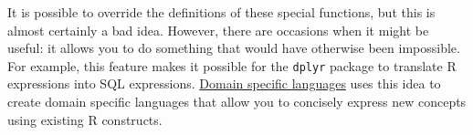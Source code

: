 \begin{Shaded}
\begin{Highlighting}[]
\StringTok{ }\StringTok{ }
\StringTok{ }
\DataTypeTok{+}

\NormalTok{:}\NormalTok{) }
\NormalTok{:}\NormalTok{, }

\StringTok{ }\NormalTok{) }\NormalTok{(}\NormalTok{(}\NormalTok{)}
\StringTok{ }\NormalTok{, }\NormalTok{(}\NormalTok{), }\NormalTok{(}\NormalTok{))}

\NormalTok{x[}\NormalTok{]}
\DataTypeTok{[}\NormalTok{)}

\NormalTok{\{ }\NormalTok{(}\NormalTok{); }\NormalTok{(}\NormalTok{); }\NormalTok{(}\NormalTok{) \}}
\DataTypeTok{\{}\NormalTok{(}\NormalTok{(}\NormalTok{), }\NormalTok{(}\NormalTok{), }\NormalTok{(}\NormalTok{))}
\end{Highlighting}
\end{Shaded}

It is possible to override the definitions of these special functions,
but this is almost certainly a bad idea. However, there are occasions
when it might be useful: it allows you to do something that would have
otherwise been impossible. For example, this feature makes it possible
for the \texttt{dplyr} package to translate R expressions into SQL
expressions. \hyperref[dsl]{Domain specific languages} uses this idea to
create domain specific languages that allow you to concisely express new
concepts using existing R constructs.

